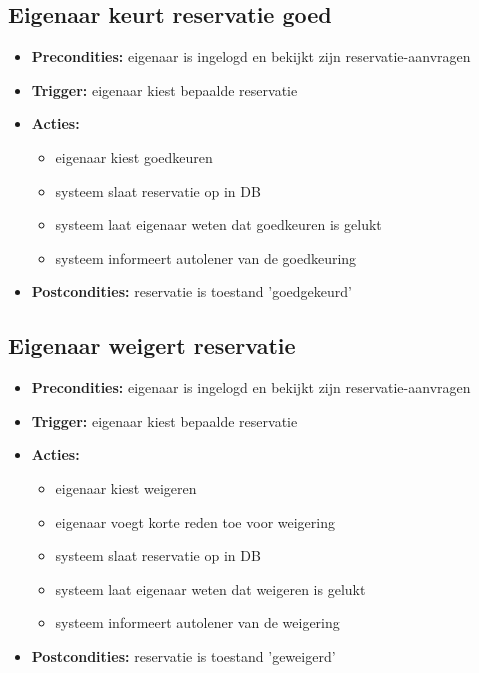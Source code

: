 \documentclass[]{article}
\begin{document}
\subsection{Eigenaar keurt reservatie goed}
\begin{itemize}
\item \textbf{Precondities:} eigenaar is ingelogd en bekijkt zijn reservatie-aanvragen \item \textbf{Trigger:} eigenaar kiest bepaalde reservatie
\item \textbf{Acties:} \begin{itemize}
\item	eigenaar kiest goedkeuren
	
\item	systeem slaat reservatie op in DB
\item      systeem laat eigenaar weten dat goedkeuren is gelukt
\item      systeem informeert autolener van de goedkeuring
\end{itemize}
\item \textbf{Postcondities:} reservatie is toestand 'goedgekeurd'
\end{itemize}


\subsection{Eigenaar weigert reservatie}
\begin{itemize}
\item \textbf{Precondities:} eigenaar is ingelogd en bekijkt zijn reservatie-aanvragen \item \textbf{Trigger:} eigenaar kiest bepaalde reservatie
\item \textbf{Acties:} \begin{itemize}
\item	eigenaar kiest weigeren
\item	eigenaar voegt korte reden toe voor weigering
\item	systeem slaat reservatie op in DB
\item      systeem laat eigenaar weten dat weigeren is gelukt
\item      systeem informeert autolener van de weigering
\end{itemize}
\item \textbf{Postcondities:} reservatie is toestand 'geweigerd'
\end{itemize}
\end{document}
